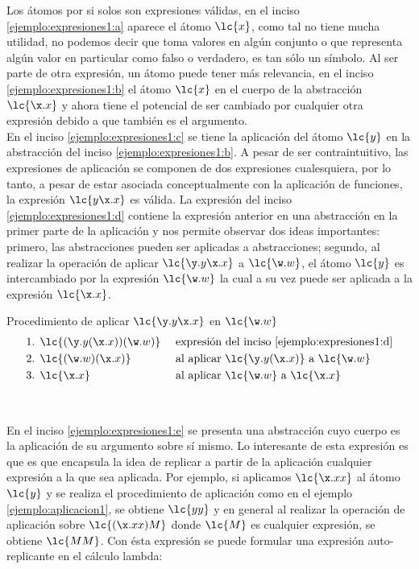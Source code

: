 Los átomos por si solos son expresiones válidas, en el inciso \eqref{ejemplo:expresiones1:a} aparece el átomo \(\lc{x}\), como tal no tiene mucha utilidad, no podemos decir que toma valores en algún conjunto o que representa algún valor en particular como falso o verdadero, es tan sólo un símbolo. Al ser parte de otra expresión, un átomo puede tener más relevancia, en el inciso \eqref{ejemplo:expresiones1:b} el átomo \(\lc{x}\) en el cuerpo de la abstracción \(\lc{\x.x}\) y ahora tiene el potencial de ser cambiado por cualquier otra expresión debido a que también es el argumento. \\

En el inciso \eqref{ejemplo:expresiones1:c} se tiene la aplicación del átomo \(\lc{y}\) en la abstracción del inciso \eqref{ejemplo:expresiones1:b}. A pesar de ser contraintuitivo, las expresiones de aplicación se componen de dos expresiones cualesquiera, por lo tanto, a pesar de estar asociada conceptualmente con la aplicación de funciones, la expresión \(\lc{y\x.x}\) es válida. La expresión del inciso \eqref{ejemplo:expresiones1:d} contiene la expresión anterior en una abstracción en la primer parte de la aplicación y nos permite observar dos ideas importantes: primero, las abstracciones pueden ser aplicadas a abstracciones; segundo, al realizar la operación de aplicar \(\lc{\y.y\x.x}\) a \(\lc{\w.w}\), el átomo \(\lc{y}\) es intercambiado por la expresión \(\lc{\w.w}\) la cual a su vez puede ser aplicada a la expresión \(\lc{\x.x}\). \\

\begin{ejemplo} Procedimiento de aplicar \(\lc{\y.y\x.x}\) en \(\lc{\w.w}\) \label{ejemplo:aplicacion1}
  \begin{align*}
    \text{1. } &\lc{(\y.y(\x.x))(\w.w)} & &\text{ expresión del inciso \eqref{ejemplo:expresiones1:d}}\\ 
    \text{2. } &\lc{(\w.w)(\x.x)} & &\text{ al aplicar } \lc{\y.y(\x.x)} \text{ a } \lc{\w.w}\\ 
    \text{3. } &\lc{\x.x} & &\text{ al aplicar } \lc{\w.w} \text{ a } \lc{\x.x}
  \end{align*}
\end{ejemplo} \

En el inciso \eqref{ejemplo:expresiones1:e} se presenta una abstracción cuyo cuerpo es la aplicación de su argumento sobre sí mismo. Lo interesante de esta expresión es que es que encapsula la idea de replicar a partir de la aplicación cualquier expresión a la que sea aplicada. Por ejemplo, si aplicamos \(\lc{\x.x x}\) al átomo \(\lc{y}\) y se realiza el procedimiento de aplicación como en el ejemplo \ref{ejemplo:aplicacion1}, se obtiene \(\lc{y y}\) y en general al realizar la operación de aplicación sobre \(\lc{(\x.x x)M}\) donde \(\lc{M}\) es cualquier expresión, se obtiene \(\lc{M M}\). Con ésta expresión se puede formular una expresión auto-replicante en el cálculo lambda: \\


